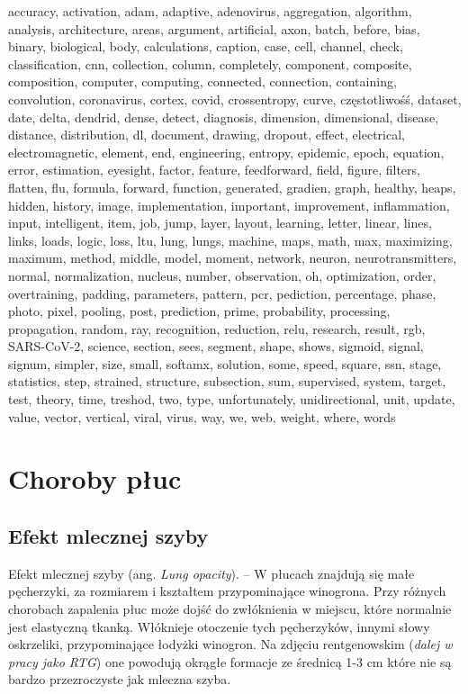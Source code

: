 \documentclass{article}
\begin{document}
accuracy, activation, adam, adaptive, adenovirus, aggregation, algorithm, analysis, architecture, areas, argument, artificial, axon, batch, before, bias, binary, biological, body, calculations, caption, case, cell, channel, check, classification, cnn, collection, column, completely, component, composite, composition, computer, computing, connected, connection, containing, convolution, coronavirus, cortex, covid, crossentropy, curve, częstotliwośś, dataset, date, delta, dendrid, dense, detect, diagnosis, dimension, dimensional, disease, distance, distribution, dl, document, drawing, dropout, effect, electrical, electromagnetic, element, end, engineering, entropy, epidemic, epoch, equation, error, estimation, eyesight, factor, feature, feedforward, field, figure, filters, flatten, flu, formula, forward, function, generated, gradien, graph, healthy, heaps, hidden, history, image, implementation, important, improvement, inflammation, input, intelligent, item, job, jump, layer, layout, learning, letter, linear, lines, links, loads, logic, loss, ltu, lung, lungs, machine, maps, math, max, maximizing, maximum, method, middle, model, moment, network, neuron, neurotransmitters, normal, normalization, nucleus, number, observation, oh, optimization, order, overtraining, padding, parameters, pattern, pcr, pediction, percentage, phase, photo, pixel, pooling, post, prediction, prime, probability, processing, propagation, random, ray, recognition, reduction, relu, research, result, rgb, SARS-CoV-2, science, section, sees, segment, shape, shows, sigmoid, signal, signum, simpler, size, small, softamx, solution, some, speed, square, ssn, stage, statistics, step, strained, structure, subsection, sum, supervised, system, target, test, theory, time, treshod, two, type, unfortunately, unidirectional, unit, update, value, vector, vertical, viral, virus, way, we, web, weight, where, words



\section{Choroby płuc}

\subsection{Efekt mlecznej szyby}
Efekt mlecznej szyby (ang. \textit{Lung opacity}). – W płucach znajdują się małe pęcherzyki, za rozmiarem i kształtem przypominające winogrona. Przy różnych chorobach zapalenia płuc może dojść do zwłóknienia w miejscu, które normalnie jest elastyczną tkanką. Włóknieje otoczenie tych pęcherzyków, innymi słowy oskrzeliki, przypominające łodyżki winogron. Na zdjęciu rentgenowskim (\textit{dalej w pracy jako RTG}) one powodują okrągłe formacje ze średnicą 1-3 cm które nie są bardzo przezroczyste jak mleczna szyba.
\end{document}
